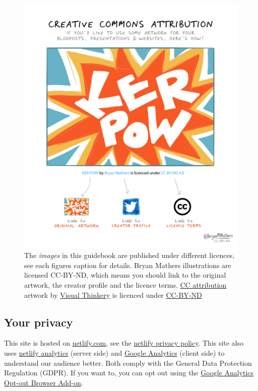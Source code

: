 \documentclass[
]{book}
\begin{document}
\begin{figure}

{\centering \includegraphics[width=1\linewidth]{images/CC-attribution-1} 

}

\caption{The \emph{images} in this guidebook are published under different licences, see each figures caption for details. Bryan Mathers illustrations are licensed CC-BY-ND, which means you should link to the original artwork, the creator profile and the licence terms. \href{https://bryanmmathers.com/cc-attribution/}{CC attribution} artwork by \href{https://visualthinkery.com/}{Visual Thinkery} is licenced under \href{https://creativecommons.org/licenses/by-nd/4.0/}{CC-BY-ND}}\label{fig:kapow-fig}
\end{figure}



\hypertarget{privacy}{%
\subsection{Your privacy}\label{privacy}}

This site is hosted on \href{https://www.netlify.com/}{netlify.com}, see the \href{https://www.netlify.com/privacy/}{netlify privacy policy}. This site also uses \href{https://docs.netlify.com/monitor-sites/analytics/}{netlify analytics} (server side) and \href{https://en.wikipedia.org/wiki/Google_Analytics}{Google Analytics} (client side) to understand our audience better. Both comply with the General Data Protection Regulation (GDPR). If you want to, you can opt out using the \href{https://tools.google.com/dlpage/gaoptout/}{Google Analytics Opt-out Browser Add-on}.
\end{document}
